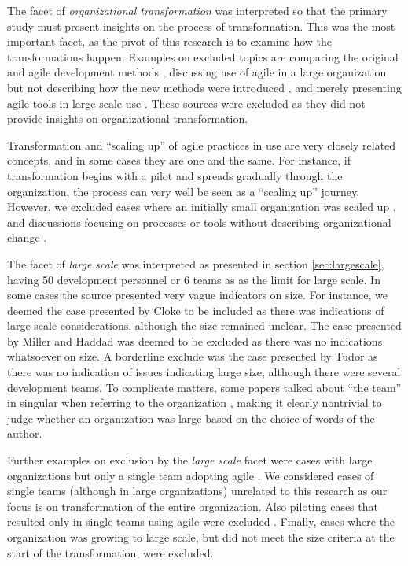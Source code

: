The facet of \emph{organizational transformation} was interpreted so that the
primary study must present insights on the process of transformation. This
was the most important facet, as the pivot of this research is to examine
how the transformations happen. Examples on excluded topics are comparing the
original and agile development methods \cite{Petersen2010}, discussing use of
agile in a large organization but not describing how the new methods were
introduced \cite{Mishra2011}, and merely presenting agile tools in large-scale
use \cite{Kim2012}. These sources were excluded as they did not provide insights
on organizational transformation.

Transformation and ``scaling up'' of agile practices in use are very closely
related concepts, and in some cases they are one and the same. For instance, if
transformation begins with a pilot and spreads gradually through the
organization, the process can very well be seen as a ``scaling up'' journey.
However, we excluded cases where an initially small organization was scaled up
\cite{Maranzato2012}, and discussions focusing on processes or tools without
describing organizational change \cite{Lyon2008}.

The facet of \emph{large scale} was interpreted as presented in section
\ref{sec:largescale}, having 50 development personnel or 6 teams as as the limit
for large scale. In some cases the source presented very vague indicators on
size. For instance, we deemed the case presented by Cloke \cite{Cloke2007} to be
included as there was indications of large-scale considerations, although the
size remained unclear. The case presented by Miller and Haddad \cite{Miller2012}
was deemed to be excluded as there was no indications whatsoever on size. A
borderline exclude was the case presented by Tudor \cite{Tudor2006} as there was
no indication of issues indicating large size, although there were several
development teams.
To complicate matters, some papers talked about ``the team'' in singular when
referring to the organization \cite{Hodgkins2007}, making it clearly nontrivial
to judge whether an organization was large based on the choice of words of the
author.

Further examples on exclusion by the \emph{large scale} facet were cases with
large organizations but only a single team adopting agile \cite{Fulgham2011}.
We considered cases of single teams (although in large organizations) unrelated
to this research as our focus is on transformation of the entire organization.
Also piloting cases that resulted only in single teams using agile were excluded
\cite{Scott2008}. Finally, cases where the organization was growing to large
scale, but did not meet the size criteria at the start of the transformation,
were excluded.

